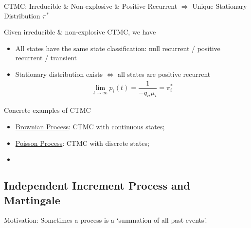 \begin{point}
    CTMC: Irreducible \& Non-explosive \& Positive Recurrent $ \Rightarrow  $ Unique Stationary Distribution $ \pi^* $
\end{point}

Given irreducible \& non-explosive CTMC, we have
\begin{itemize}[topsep=2pt,itemsep=0pt]
    \item All states have the same state classification: null recurrent / positive recurrent / transient
    \item Stationary distribution exists $ \Leftrightarrow $ all states are positive recurrent
    \begin{align}
        \lim_{t\to\infty}p_i(t)=\dfrac{1}{-q_{ii}\mu _i} = \pi^*_i
    \end{align}
\end{itemize}


\begin{point}
    Concrete examples of CTMC
\end{point}
\begin{itemize}[topsep=2pt,itemsep=0pt]
    \item \hyperlink{BrownianProcess}{Brownian Process}: CTMC with continuous states;
    \item \hyperlink{PoissonProcess}{Poisson Process}: CTMC with discrete states;
    \item 
\end{itemize}


\subsection{Independent Increment Process and Martingale}\label{SubSubSectionIndepedentProcess}

Motivation: Sometimes a process is a `summation of all past events'.


